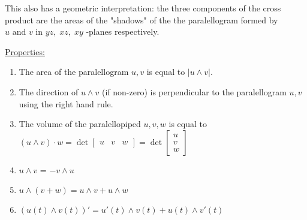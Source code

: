 \documentclass[../main.tex]{subfiles}
\begin{document}
This also has a geometric interpretation: the three components of the cross product are the areas of the "shadows"
of the the paralellogram formed by \( u \text{ and } v \) in \( yz, \; xz, \; xy \) -planes respectively.

\underline{Properties:}
\begin{enumerate}
    \item The area of the paralellogram \( u,v \) is equal to \( \left| u \wedge v \right| \). 
    \item The direction of \( u \wedge v \) (if non-zero) is perpendicular to the paralellogram \( u,v \) using the right hand rule.
    \item The volume of the paralellopiped \( u,v,w \) is equal to \( (u \wedge v) \cdot w = \det \begin{bmatrix}
        u & v & w
    \end{bmatrix} = \det \begin{bmatrix}
        u \\ v \\ w
    \end{bmatrix} \)
    \item \( u \wedge v \) =  \( - v \wedge u \)
    \item \( u \wedge (v+w) = u \wedge v + u \wedge w \)
    \item \( \left( u(t) \wedge v(t) \right)' = u'(t) \wedge v(t) + u(t) \wedge v'(t) \)
\end{enumerate}
\end{document}
